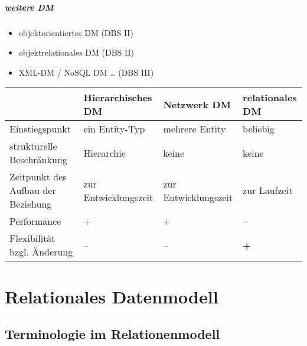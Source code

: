 \paragraph{weitere DM}
\begin{itemize}
\item objektorientiertes DM (DBS II)
\item objektrelationales DM (DBS II)
\item XML-DM / NoSQL DM … (DBS III)
\end{itemize}
\begin{tabular}{
>{\raggedright} p{} |
>{\raggedright} p{} |
>{\raggedright} p{} |
>{\raggedright} p{} 
}
& Hierarchisches DM & Netzwerk DM & relationales DM\tabularnewline
\hline
Einstiegspunkt & ein Entity-Typ & mehrere Entity & beliebig\tabularnewline
strukturelle Beschränkung & Hierarchie & keine & keine \tabularnewline
Zeitpunkt des Aufbau der Beziehung & zur Entwicklungszeit & zur Entwicklungszeit & zur Laufzeit \tabularnewline
Performance & + & + & \Large{\textbf{--}}\tabularnewline
Flexibilität bzgl. Änderung & -- & -- & \Large{\textbf{+}}
\end{tabular}
\chapter{Relationales Datenmodell}
\section{Terminologie im Relationenmodell}

